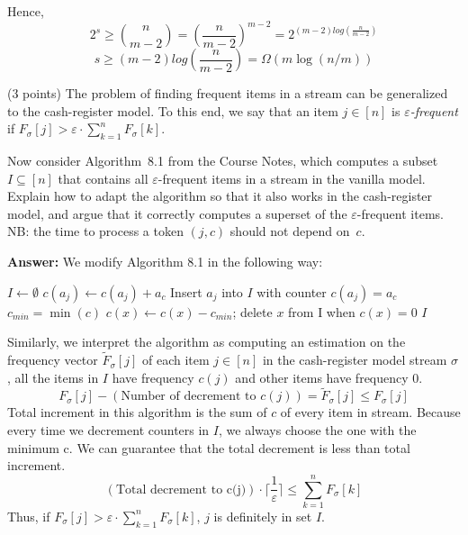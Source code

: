 \documentclass{article}
\newcommand{\eps}{\varepsilon}
\renewcommand{\leq}{\leqslant}
\renewcommand{\geq}{\geqslant}
\newcounter{rcounter}
\newenvironment{rlist}%
{\begin{list}{\setnr-\arabic{rcounter}}{\usecounter{rcounter}}}{\end{list}}
\begin{document}
\begin{rlist}
        Hence, 
        $$2^s \geq \binom{n}{m-2} = (\frac{n}{m-2})^{m-2}=2^{(m-2)log(\frac{n}{m-2})}$$
        $$s \geq (m-2)log(\frac{n}{m-2}) = \Omega(m\log(n/m))$$
        \item (3 points)
        The problem of finding frequent items in a stream can be generalized to the cash-register model. To this end, we say that an item $j\in [n]$ is \emph{$\eps$-frequent} if $F_{\sigma}[j] > \eps \cdot \sum_{k=1}^n F_{\sigma}[k]$.
        
        Now consider Algorithm~8.1 from the Course Notes, which computes a subset $I\subseteq [n]$ that contains all $\eps$-frequent items in a stream in the vanilla model. Explain how to adapt the algorithm so that it also works in the cash-register model, and argue that it correctly computes a superset of the $\eps$-frequent items. NB: the time to process a token $(j,c)$ should not depend on~$c$.
        
        \textbf{Answer:}
        We modify Algorithm 8.1 in the following way:
        \begin{algorithmic}[1]
            \State $I \gets \emptyset$
            \State $c(a_j) \gets c(a_j) + a_c$
            \Else
            \State Insert $a_j$ into $I$ with counter $c(a_j)=a_c$
            \If{$|I| \geq 1/\varepsilon$}
            \State $c_{min} = \min(c)$
            \State $c(x) \gets c(x) - c_{min}$; delete $x$ from I when $c(x)=0$
            \EndFor
            \EndIf
            \EndIf
            \EndFor
            \State \Return $I$
        \end{algorithmic}
        Similarly, we interpret the algorithm as computing an estimation on the frequency vector $\tilde{F}_{\sigma}[j]$ of each item $j \in [n]$ in the cash-register model stream $\sigma$, all the items in $I$ have frequency $c(j)$ and other items have frequency $0$.
        \begin{equation*}
        F_{\sigma}[j] - (\text{Number of decrement to~} c(j)) = \tilde{F}_{\sigma}[j] \leq F_{\sigma}[j]
        \end{equation*}
        Total increment in this algorithm is the sum of $c$ of every item in stream. Because every time we decrement counters in $I$, we always choose the one with the minimum c. We can guarantee that the total decrement is less than total increment.
        $$(\text{Total decrement to c(j)}) \cdot \lceil\frac{1}{\varepsilon}\rceil \leq \sum_{k=1}^n F_{\sigma}[k]$$
        Thus, if $F_{\sigma}[j] > \eps \cdot \sum_{k=1}^n F_{\sigma}[k]$, $j$ is definitely in set $I$. 
        

\end{rlist}
\end{document}
